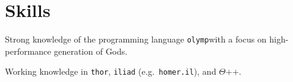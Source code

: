 \section{Skills}
Strong knowledge of the programming language \texttt{olymp}\footnotemark with a focus on high-performance generation of Gods.

Working knowledge in \texttt{thor}, \texttt{iliad} (e.g.~\texttt{homer.il}), and $\Theta\text{++}$.

